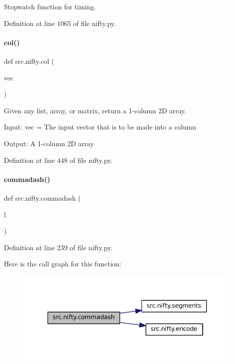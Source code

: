 Stopwatch function for timing. 



Definition at line 1065 of file nifty.\+py.

\mbox{\label{namespacesrc_1_1nifty_a9548285fa85a369d98169ec25abe974c}} 
\paragraph{\texorpdfstring{col()}{col()}}
{\footnotesize\ttfamily def src.\+nifty.\+col (\begin{DoxyParamCaption}\item[{}]{vec }\end{DoxyParamCaption})}



Given any list, array, or matrix, return a 1-\/column 2D array. 

Input\+: vec = The input vector that is to be made into a column

Output\+: A 1-\/column 2D array 

Definition at line 448 of file nifty.\+py.

\mbox{\label{namespacesrc_1_1nifty_a9606a594e252da08ee88b43b113f2367}} 
\paragraph{\texorpdfstring{commadash()}{commadash()}}
{\footnotesize\ttfamily def src.\+nifty.\+commadash (\begin{DoxyParamCaption}\item[{}]{l }\end{DoxyParamCaption})}



Definition at line 239 of file nifty.\+py.

Here is the call graph for this function\+:
\nopagebreak
\begin{figure}[H]
\begin{center}
\leavevmode
\includegraphics[width=340pt]{namespacesrc_1_1nifty_a9606a594e252da08ee88b43b113f2367_cgraph}
\end{center}
\end{figure}
\mbox{\label{namespacesrc_1_1nifty_a6b0415de425fab71c5e3f33638423204}} 
